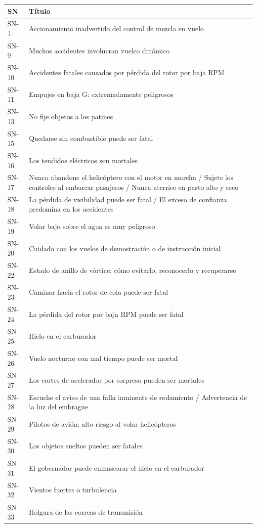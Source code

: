 \begin{longtable}{@{}lp{\dimexpr\linewidth-1.4cm-2\tabcolsep}@{}}
\toprule
SN & Título \\
\midrule
\endhead
SN-1 & Accionamiento inadvertido del control de mezcla en vuelo \\
SN-9 & Muchos accidentes involucran vuelco dinámico \\
SN-10 & Accidentes fatales causados por pérdida del rotor por baja RPM \\
SN-11 & Empujes en baja G: extremadamente peligrosos \\
SN-13 & No fije objetos a los patines \\
SN-15 & Quedarse sin combustible puede ser fatal \\
SN-16 & Los tendidos eléctricos son mortales \\
SN-17 & Nunca abandone el helicóptero con el motor en marcha / Sujete los controles al embarcar pasajeros / Nunca aterrice en pasto alto y seco \\
SN-18 & La pérdida de visibilidad puede ser fatal / El exceso de confianza predomina en los accidentes \\
SN-19 & Volar bajo sobre el agua es muy peligroso \\
SN-20 & Cuidado con los vuelos de demostración o de instrucción inicial \\
SN-22 & Estado de anillo de vórtice: cómo evitarlo, reconocerlo y recuperarse \\
SN-23 & Caminar hacia el rotor de cola puede ser fatal \\
SN-24 & La pérdida del rotor por baja RPM puede ser fatal \\
SN-25 & Hielo en el carburador \\
SN-26 & Vuelo nocturno con mal tiempo puede ser mortal \\
SN-27 & Los cortes de acelerador por sorpresa pueden ser mortales \\
SN-28 & Escuche el aviso de una falla inminente de rodamiento / Advertencia de la luz del embrague \\
SN-29 & Pilotos de avión: alto riesgo al volar helicópteros \\
SN-30 & Los objetos sueltos pueden ser fatales \\
SN-31 & El gobernador puede enmascarar el hielo en el carburador \\
SN-32 & Vientos fuertes o turbulencia \\
SN-33 & Holgura de las correas de transmisión \\

\end{longtable}
